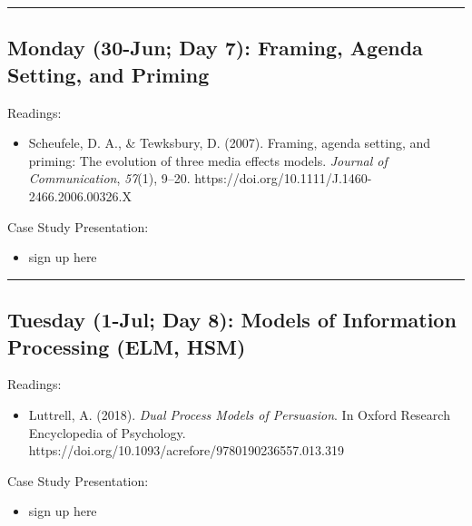 \documentclass[
  letterpaper,
]{article}
\providecommand{\tightlist}{%
  \setlength{\itemsep}{0pt}\setlength{\parskip}{0pt}}\usepackage{longtable,booktabs,array}
\begin{document}
\begin{center}\rule{0.5\linewidth}{0.5pt}\end{center}

\hypertarget{monday-30-jun-day-7-framing-agenda-setting-and-priming}{%
\subsection{Monday (30-Jun; Day 7): Framing, Agenda Setting, and
Priming}\label{monday-30-jun-day-7-framing-agenda-setting-and-priming}}

Readings:

\begin{itemize}
\tightlist
\item
  Scheufele, D. A., \& Tewksbury, D. (2007). Framing, agenda setting,
  and priming: The evolution of three media effects models.
  \emph{Journal of Communication}, \emph{57}(1), 9--20.
  https://doi.org/10.1111/J.1460-2466.2006.00326.X
\end{itemize}

Case Study Presentation:

\begin{itemize}
\tightlist
\item
  sign up here
\end{itemize}

\begin{center}\rule{0.5\linewidth}{0.5pt}\end{center}

\hypertarget{tuesday-1-jul-day-8-models-of-information-processing-elm-hsm}{%
\subsection{Tuesday (1-Jul; Day 8): Models of Information Processing
(ELM,
HSM)}\label{tuesday-1-jul-day-8-models-of-information-processing-elm-hsm}}

Readings:

\begin{itemize}
\tightlist
\item
  Luttrell, A. (2018). \emph{Dual Process Models of Persuasion}. In
  Oxford Research Encyclopedia of Psychology.
  https://doi.org/10.1093/acrefore/9780190236557.013.319
\end{itemize}

Case Study Presentation:

\begin{itemize}
\tightlist
\item
  sign up here
\end{itemize}
\end{document}
